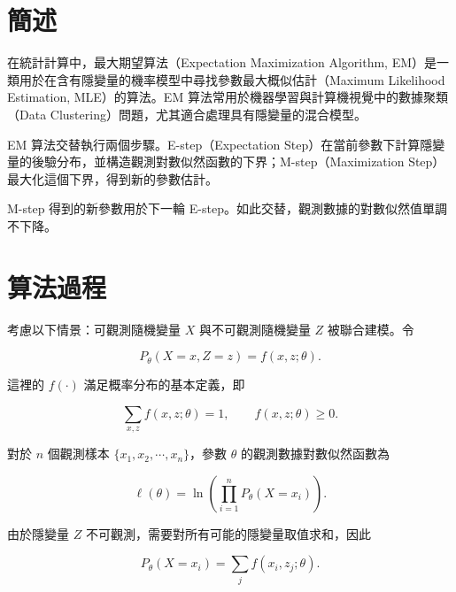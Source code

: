 \section{簡述}

在統計計算中，最大期望算法（Expectation Maximization Algorithm, EM）是一類用於在含有隱變量的機率模型中尋找參數最大概似估計（Maximum Likelihood Estimation, MLE）的算法。EM 算法常用於機器學習與計算機視覺中的數據聚類（Data Clustering）問題，尤其適合處理具有隱變量的混合模型。

EM 算法交替執行兩個步驟。E-step（Expectation Step）在當前參數下計算隱變量的後驗分布，並構造觀測對數似然函數的下界；M-step（Maximization Step）最大化這個下界，得到新的參數估計。

M-step 得到的新參數用於下一輪 E-step。如此交替，觀測數據的對數似然值單調不下降。

\section{算法過程}

考慮以下情景：可觀測隨機變量 \(X\) 與不可觀測隨機變量 \(Z\) 被聯合建模。令

\begin{equation}\label{eq-joint-distribution}
P_{\theta}(X=x, Z=z) = f(x,z;\theta).
\end{equation}

這裡的 \(f(\cdot)\) 滿足概率分布的基本定義，即

\begin{equation}\label{eq-probability-condition}
\sum_{x,z} f(x,z;\theta)=1,
\qquad
f(x,z;\theta)\ge 0.
\end{equation}

對於 \(n\) 個觀測樣本 \(\{x_1,x_2,\cdots,x_n\}\)，參數 \(\theta\) 的觀測數據對數似然函數為

\begin{equation}\label{eq-log-likelihood-product}
\ell(\theta)
=
\ln\left(
\prod_{i=1}^{n} P_{\theta}(X=x_i)
\right).
\end{equation}

由於隱變量 \(Z\) 不可觀測，需要對所有可能的隱變量取值求和，因此

\begin{equation}\label{eq-marginal-likelihood}
P_{\theta}(X=x_i)
=
\sum_j f(x_i,z_j;\theta).
\end{equation}


